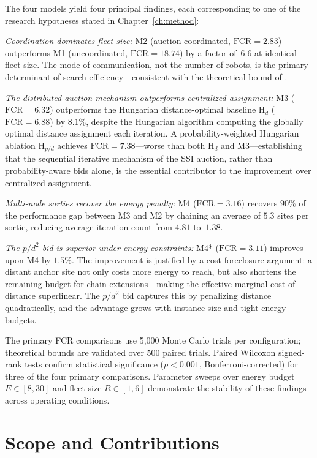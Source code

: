 \begin{doublespacing}
The four models yield four principal findings, each corresponding to
one of the research hypotheses stated in Chapter~\ref{ch:method}:

\emph{Coordination dominates fleet size:}  M2 (auction-coordinated,
$\mathrm{FCR} = 2.83$) outperforms M1 (uncoordinated,
$\mathrm{FCR} = 18.74$) by a factor of~$6.6$ at identical fleet size.
The mode of communication, not the number of robots, is the primary
determinant of search efficiency---consistent with the theoretical
bound of \citet{Chrobak2015}.

\emph{The distributed auction mechanism outperforms centralized
assignment:}  M3 ($\mathrm{FCR} = 6.32$) outperforms the Hungarian
distance-optimal baseline H$_d$ ($\mathrm{FCR} = 6.88$) by $8.1\%$,
despite the Hungarian algorithm computing the globally optimal
distance assignment each iteration.
A probability-weighted Hungarian ablation H$_{p/d}$ achieves
$\mathrm{FCR} = 7.38$---worse than both H$_d$ and M3---establishing
that the sequential iterative mechanism of the SSI auction, rather
than probability-aware bids alone, is the essential contributor to the
improvement over centralized assignment.

\emph{Multi-node sorties recover the energy penalty:}  M4
($\mathrm{FCR} = 3.16$) recovers $90\%$ of the performance gap between
M3 and M2 by chaining an average of $5.3$ sites per sortie, reducing
average iteration count from $4.81$ to~$1.38$.

\emph{The $p/d^2$ bid is superior under energy constraints:}  M4*
($\mathrm{FCR} = 3.11$) improves upon M4 by $1.5\%$.
The improvement is justified by a cost-foreclosure argument: a distant
anchor site not only costs more energy to reach, but also shortens the
remaining budget for chain extensions---making the effective marginal
cost of distance superlinear.
The $p/d^2$ bid captures this by penalizing distance quadratically,
and the advantage grows with instance size and tight energy budgets.

The primary FCR comparisons use 5{,}000 Monte Carlo trials per
configuration; theoretical bounds are validated over 500 paired trials.
Paired Wilcoxon signed-rank tests confirm statistical significance
($p < 0.001$, Bonferroni-corrected) for three of the four primary comparisons.
Parameter sweeps over energy budget $E \in [8, 30]$ and fleet size
$R \in [1, 6]$ demonstrate the stability of these findings across
operating conditions.

\section{Scope and Contributions}


\end{doublespacing}
